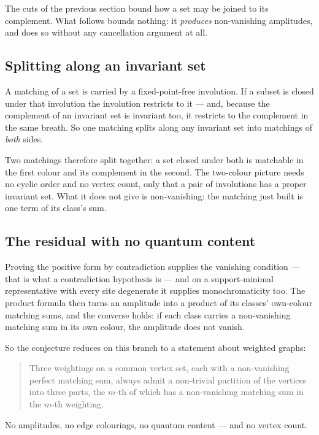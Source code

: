 \documentclass[11pt]{article}
\theoremstyle{definition}
\theoremstyle{remark}
\begin{document}
The cuts of the previous section bound how a set may be joined to its complement. What
follows bounds nothing: it \emph{produces} non-vanishing amplitudes, and does so without
any cancellation argument at all.

\subsection*{Splitting along an invariant set}

A matching of a set is carried by a fixed-point-free involution. If a subset is closed
under that involution the involution restricts to it --- and, because the complement of
an invariant set is invariant too, it restricts to the complement in the same breath. So
one matching splits along any invariant set into matchings of \emph{both} sides.

Two matchings therefore split together: a set closed under both is matchable in the first
colour and its complement in the second. The two-colour picture needs no cyclic order and
no vertex count, only that a pair of involutions has a proper invariant set. What it does
not give is non-vanishing: the matching just built is one term of its class's sum.

\subsection*{The residual with no quantum content}

Proving the positive form by contradiction supplies the vanishing condition --- that is
what a contradiction hypothesis is --- and on a support-minimal representative with every
site degenerate it supplies monochromaticity too. The product formula then turns an
amplitude into a product of its classes' own-colour matching sums, and the converse holds:
if each class carries a non-vanishing matching sum in its own colour, the amplitude does
not vanish.

So the conjecture reduces on this branch to a statement about weighted graphs:

\begin{quote}
Three weightings on a common vertex set, each with a non-vanishing perfect matching sum,
always admit a non-trivial partition of the vertices into three parts, the $m$-th of which
has a non-vanishing matching sum in the $m$-th weighting.
\end{quote}

No amplitudes, no edge colourings, no quantum content --- and no vertex count.
\end{document}
